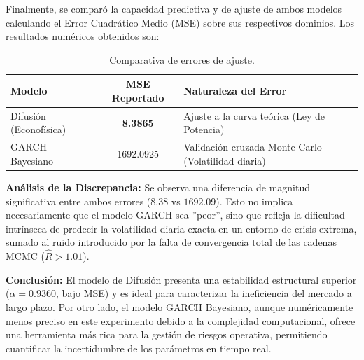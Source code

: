 Finalmente, se comparó la capacidad predictiva y de ajuste de ambos modelos calculando el Error Cuadrático Medio (MSE) sobre sus respectivos dominios. Los resultados numéricos obtenidos son:

\begin{table}[h!]
\centering
\begin{tabular}{|l|c|l|}
\hline
\textbf{Modelo} & \textbf{MSE Reportado} & \textbf{Naturaleza del Error} \\ \hline
Difusión (Econofísica) & \textbf{8.3865} & Ajuste a la curva teórica (Ley de Potencia) \\ \hline
GARCH Bayesiano & 1692.0925 & Validación cruzada Monte Carlo (Volatilidad diaria) \\ \hline
\end{tabular}
\caption{Comparativa de errores de ajuste.}
\label{tab:mse_results}
\end{table}

\textbf{Análisis de la Discrepancia:}
Se observa una diferencia de magnitud significativa entre ambos errores ($8.38$ vs $1692.09$). Esto no implica necesariamente que el modelo GARCH sea ''peor'', sino que refleja la dificultad intrínseca de predecir la volatilidad diaria exacta en un entorno de crisis extrema, sumado al ruido introducido por la falta de convergencia total de las cadenas MCMC ($\hat{R} > 1.01$).

\textbf{Conclusión:}
El modelo de Difusión \cite{Alvarez2002} presenta una estabilidad estructural superior ($\alpha=0.9360$, bajo MSE) y es ideal para caracterizar la ineficiencia del mercado a largo plazo. Por otro lado, el modelo GARCH Bayesiano, aunque numéricamente menos preciso en este experimento debido a la complejidad computacional, ofrece una herramienta más rica para la gestión de riesgos operativa, permitiendo cuantificar la incertidumbre de los parámetros en tiempo real.